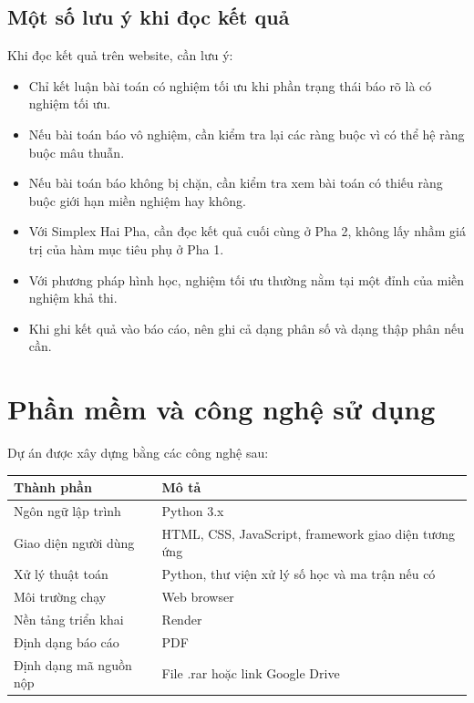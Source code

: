 \documentclass[14pt, a4paper]{extarticle}
\begin{document}
    \subsection{Một số lưu ý khi đọc kết quả}
    
    Khi đọc kết quả trên website, cần lưu ý:
    
    \begin{itemize}
        \item Chỉ kết luận bài toán có nghiệm tối ưu khi phần trạng thái báo rõ là có nghiệm tối ưu.
        \item Nếu bài toán báo vô nghiệm, cần kiểm tra lại các ràng buộc vì có thể hệ ràng buộc mâu thuẫn.
        \item Nếu bài toán báo không bị chặn, cần kiểm tra xem bài toán có thiếu ràng buộc giới hạn miền nghiệm hay không.
        \item Với Simplex Hai Pha, cần đọc kết quả cuối cùng ở Pha 2, không lấy nhầm giá trị của hàm mục tiêu phụ ở Pha 1.
        \item Với phương pháp hình học, nghiệm tối ưu thường nằm tại một đỉnh của miền nghiệm khả thi.
        \item Khi ghi kết quả vào báo cáo, nên ghi cả dạng phân số và dạng thập phân nếu cần.
    \end{itemize}
    
    \section{Phần mềm và công nghệ sử dụng}
    
    Dự án được xây dựng bằng các công nghệ sau:
    
    \begin{longtable}{|p{5cm}|p{8cm}|}
    \hline
    \textbf{Thành phần} & \textbf{Mô tả} \\
    \hline
    Ngôn ngữ lập trình & Python 3.x \\
    \hline
    Giao diện người dùng & HTML, CSS, JavaScript, framework giao diện tương ứng \\
    \hline
    Xử lý thuật toán & Python, thư viện xử lý số học và ma trận nếu có \\
    \hline
    Môi trường chạy & Web browser \\
    \hline
    Nền tảng triển khai & Render \\
    \hline
    Định dạng báo cáo & PDF \\
    \hline
    Định dạng mã nguồn nộp & File .rar hoặc link Google Drive \\
    \hline
    \end{longtable}
        
\end{document}
